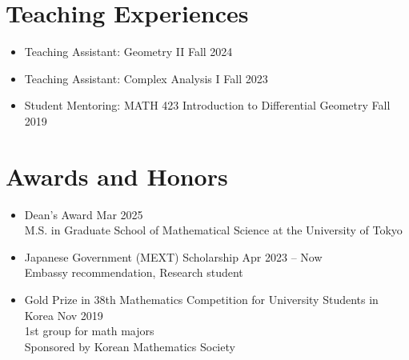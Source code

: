 \documentclass[11pt,a4paper]{article}
\begin{document}
\section*{Teaching Experiences}
\begin{itemize}
\item
	Teaching Assistant: Geometry II
	\hfill{\small Fall 2024}
\item
	Teaching Assistant: Complex Analysis I
	\hfill{\small Fall 2023}
\item
	Student Mentoring: MATH 423 Introduction to Differential Geometry
	\hfill{\small Fall 2019}\\
\end{itemize}




\section*{Awards and Honors}
\begin{itemize}
\item
	Dean's Award
	\hfill{\small Mar 2025}\\
	M.S. in Graduate School of Mathematical Science at the University of Tokyo
\item
	Japanese Government (MEXT) Scholarship
	\hfill{\small Apr 2023 -- Now}\\
	Embassy recommendation, Research student
\item
	Gold Prize in 38th Mathematics Competition for University Students in Korea
	\hfill{\small Nov 2019}\\
	1st group for math majors\\
	Sponsored by Korean Mathematics Society
\end{itemize}
\end{document}
